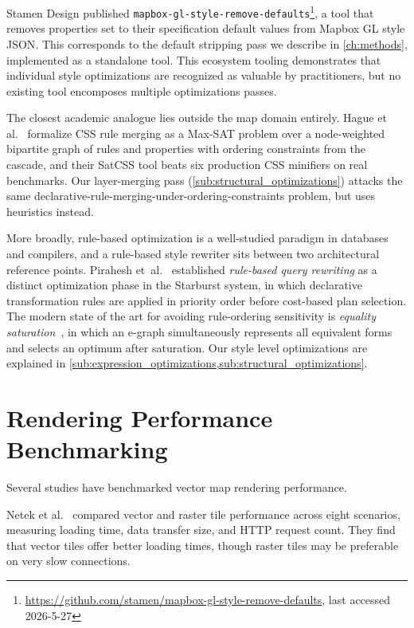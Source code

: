 Stamen Design published \texttt{mapbox-gl-style-remove-defaults}\footnote{\url{https://github.com/stamen/mapbox-gl-style-remove-defaults}, last accessed 2026-5-27}, a tool that removes properties set to their specification default values from Mapbox GL style \ac{JSON}.
This corresponds to the default stripping pass we describe in \cref{ch:methods}, implemented as a standalone tool.
This ecosystem tooling demonstrates that individual style optimizations are recognized as valuable by practitioners, but no existing tool encomposes multiple optimizations passes.

The closest academic analogue lies outside the map domain entirely.
Hague et al.~\cite{hagueCSSMinificationConstraint2019} formalize \ac{CSS} rule merging as a Max-SAT problem over a node-weighted bipartite graph of rules and properties with ordering constraints from the cascade, and their SatCSS tool beats six production \ac{CSS} minifiers on real benchmarks.
Our layer-merging pass (\cref{sub:structural_optimizations}) attacks the same declarative-rule-merging-under-ordering-constraints problem, but uses heuristics instead.

More broadly, rule-based optimization is a well-studied paradigm in databases and compilers, and a rule-based style rewriter sits between two architectural reference points.
Pirahesh et~al.~\cite{piraheshExtensibleRuleBased1992} established \emph{rule-based query rewriting} as a distinct optimization phase in the Starburst system, in which declarative transformation rules are applied in priority order before cost-based plan selection.
The modern state of the art for avoiding rule-ordering sensitivity is \emph{equality saturation}~\cite{tateEqualitySaturationNew2009,willseyEggFastExtensible2021}, in which an e-graph simultaneously represents all equivalent forms and selects an optimum after saturation.
Our style level optimizations are explained in \cref{sub:expression_optimizations,sub:structural_optimizations}.

\section{Rendering Performance Benchmarking}\label{sec:rw_benchmarking}

Several studies have benchmarked vector map rendering performance.

Netek et al.~\cite{netekPerformanceTestingVector2020} compared vector and raster tile performance across eight scenarios, measuring loading time, data transfer size, and \ac{HTTP} request count.
They find that vector tiles offer better loading times, though raster tiles may be preferable on very slow connections.

